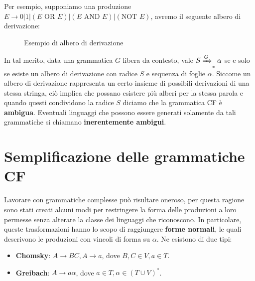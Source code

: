 \noindent Per esempio, supponiamo una produzione $E\to 0|1|(E \text{ OR } E)|(E \text{ AND } E)|(\text{NOT } E)$, avremo il seguente albero di
derivazione: \begin{figure}[h]
    \centering
    \caption{Esempio di albero di derivazione}
\end{figure}

\noindent In tal merito, data una grammatica $G$ libera da contesto, vale $S\xRightarrow{G}_* \alpha$ se e solo se esiste un albero di derivazione con
radice $S$ e sequenza di foglie $\alpha$. Siccome un albero di derivazione rappresenta un certo insieme di possibili derivazioni di una stessa stringa,
ciò implica che possano esistere più alberi per la stessa parola e quando questi condividono la radice $S$ diciamo che la grammatica CF è
\textbf{ambigua}. Eventuali linguaggi che possono essere generati solamente da tali grammatiche si chiamano \textbf{inerentemente ambigui}.

%

\section{Semplificazione delle grammatiche CF}
Lavorare con grammatiche complesse può risultare oneroso, per questa ragione sono stati creati alcuni modi per restringere la forma delle produzioni a
loro permesse senza alterare la classe dei linguaggi che riconoscono. In particolare, queste trasformazioni hanno lo scopo di raggiungere \textbf{forme
normali}, le quali descrivono le produzioni con vincoli di forma su $\alpha$. Ne esistono di due tipi: \begin{itemize}
    \item \textbf{Chomsky}: $A\to BC, A\to a$, dove $B,C\in V, a\in T$.
    \item \textbf{Greibach}: $A\to a\alpha$, dove $a\in T, \alpha\in (T\cup V)^*$.
\end{itemize}

